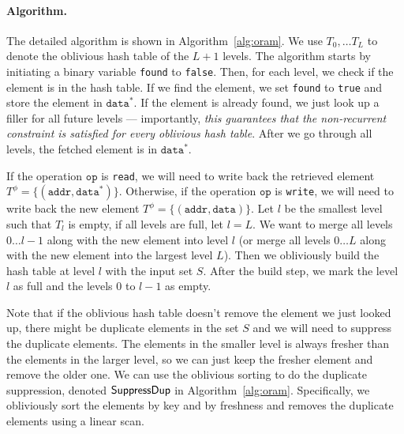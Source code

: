\paragraph{Algorithm.} The detailed algorithm is 
shown in Algorithm~\ref{alg:oram}. 
We use $T_0, \ldots T_L$ to denote the oblivious hash table
of the $L+1$ levels.
The algorithm starts by initiating a binary variable \texttt{found} to \texttt{false}.
Then, for each level, we check if the element is in the hash table. 
If we find the element, we set \texttt{found} to \texttt{true} and store the element in $\texttt{data}^*$.
If the element is already found, we just look up a filler 
for all future levels 
---
importantly, 
{\it this guarantees 
that the non-recurrent
constraint is satisfied for every oblivious hash table}.
After we go through all levels, 
the fetched element is in $\texttt{data}^*$.

If the operation $\texttt{op}$ is \texttt{read}, we will need to write back 
the retrieved element $T^\phi = \{(\texttt{addr}, \texttt{data}^*)\}$.
Otherwise, if the operation $\texttt{op}$ is \texttt{write}, we will need to write back the new element $T^\phi = \{(\texttt{addr}, \texttt{data})\}$.
Let $l$ be the smallest level such that $T_l$ is empty, if all levels are full, let $l = L$.
We want to merge all levels $0\ldots l-1$ along with the new element 
into level $l$ (or merge all levels $0\ldots L$ along with the new
element into the largest level $L$). 
Then we obliviously build the hash table at level $l$ with the input set $S$.
After the build step, we mark the level $l$ as 
full and the levels $0$ to $l-1$ as empty.

Note that if the oblivious hash table doesn't remove the element we just looked up, there might be duplicate elements in the set $S$ and we will need to suppress the duplicate elements.
The elements in the smaller level is always fresher than the elements in the larger level, so we can just keep the fresher element and remove the older one.
We can use the oblivious sorting to do the duplicate
suppression, denoted ${\sf SuppressDup}$
in Algorithm~\ref{alg:oram}. 
Specifically, we obliviously sort 
the elements by key and by 
freshness and removes the duplicate elements using a linear scan.


